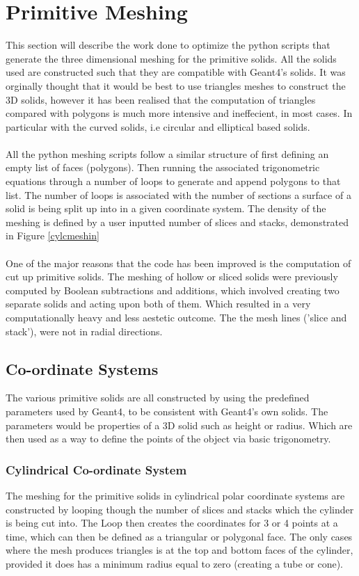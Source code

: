 \documentclass[12pt,a4paper]{article}
\begin{document}
\section{Primitive Meshing}
This section will describe the work done to optimize the python scripts that generate the three dimensional meshing for the primitive solids. All the solids used are constructed such that they are compatible with Geant4's solids. It was orginally thought that it would be best to use triangles meshes to construct the 3D solids, however it has been realised that the computation of triangles compared with polygons is much more intensive and ineffecient, in most cases. In particular with the curved solids, i.e circular and elliptical based solids.
\\\\
All the python meshing scripts follow a similar structure of first defining an empty list of faces (polygons). Then running the associated trigonometric equations through a number of loops to generate and append polygons to that list. The number of loops is associated with the number of sections a surface of a solid is being split up into in a given coordinate system. The density of the meshing is defined by a user inputted number of slices and stacks, demonstrated in Figure \ref{cylcmeshin}
\\\\
One of the major reasons that the code has been improved is the computation of cut up primitive solids. The meshing of hollow or sliced solids were previously computed by Boolean subtractions and additions, which involved creating two separate solids and acting upon both of them. Which resulted in a very computationally heavy and less aestetic outcome. The the mesh lines ('slice and stack'), were not in radial directions.

\subsection{Co-ordinate Systems}
The various primitive solids are all constructed by using the predefined parameters used by Geant4, to be consistent with Geant4's own solids. The parameters would be properties of a 3D solid such as height or radius. Which are then used as a way to define the points of the object via basic trigonometry.\

\newpage
\subsubsection{Cylindrical Co-ordinate System}
The meshing for the primitive solids in cylindrical polar coordinate systems are constructed by looping though the number of slices and stacks which the cylinder is being cut into. The Loop then creates the coordinates for 3 or 4 points at a time, which can then be defined as a triangular or polygonal face. The only cases where the mesh produces triangles is at the top and bottom faces of the cylinder, provided it does has a minimum radius equal to zero (creating a tube or cone). 
\end{document}
